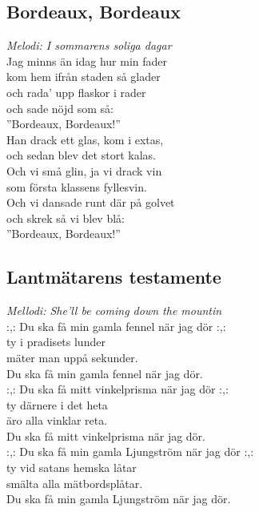 \documentclass[a5paper]{article}
\begin{document}
	\subsection{Bordeaux, Bordeaux}
		\textit{Melodi: I sommarens soliga dagar} \\
		
		\noindent
		Jag minns än idag hur min fader \\
		kom hem ifrån staden så glader \\
		och rada’ upp flaskor i rader \\
		och sade nöjd som så: \\
		”Bordeaux, Bordeaux!” \\
		
		\noindent 
		Han drack ett glas, kom i extas, \\
		och sedan blev det stort kalas. \\
		Och vi små glin, ja vi drack vin \\
		som första klassens fyllesvin. \\
		Och vi dansade runt där på golvet \\
		och skrek så vi blev blå:\\
		”Bordeaux, Bordeaux!” \\
		
		\newpage
		
		
\subsection{Lantmätarens testamente}
\textit{Mellodi: She'll be coming down the mountin} \\

\noindent
:,: Du ska få min gamla fennel när jag dör :,: \\
ty i pradisets lunder \\
mäter man uppå sekunder. \\ 
Du ska få min gamla fennel när jag dör. \\

\noindent
:,: Du ska få mitt vinkelprisma när jag dör :,:\\
ty därnere i det heta \\
äro alla vinklar reta. \\
Du ska få mitt vinkelprisma när jag dör. \\

\noindent
:,: Du ska få min gamla Ljungström när jag dör :,: \\
ty vid satans hemska låtar \\
smälta alla mätbordsplåtar. \\
Du ska få min gamla Ljungström när jag dör.\\ 
\end{document}
